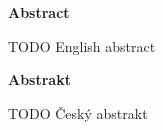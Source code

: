 \thispagestyle{plain}

\begin{center}
	\Large
	\textbf{Abstract}
\end{center}

TODO English abstract



\hfill

\begin{center}
	\Large
	\textbf{Abstrakt}
\end{center}

TODO Český abstrakt